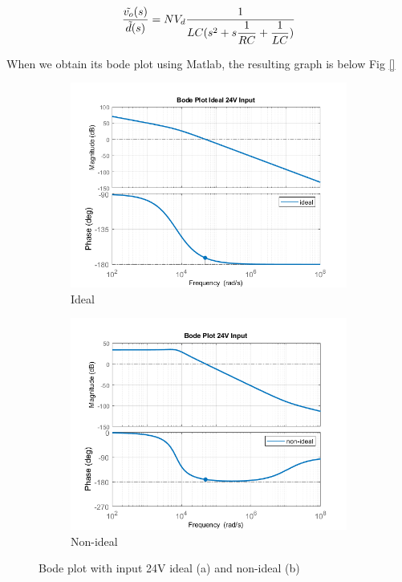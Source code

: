 \begin{equation}
   \dfrac{\Tilde{v_o}(s)}{\Tilde{d}(s)} = NV_d \dfrac{1}{LC (s^2 + s \dfrac{1}{RC} + \dfrac{1}{LC}) }
\end{equation}

When we obtain its bode plot using Matlab, the resulting graph is below Fig \ref{}

\begin{figure}[H]
\centering
\begin{subfigure}{7 cm}
  \centering
  \includegraphics[width=7 cm]{Figs/bode_24_ideal.png}
  \caption{Ideal}
  \label{fig:bode_24}
\end{subfigure}%
\begin{subfigure}{7 cm}
  \centering
  \includegraphics[width=7 cm]{Figs/bode_24_non.png}
  \caption{Non-ideal}
  \label{fig:bode_non_24}
\end{subfigure}
\caption{Bode plot with input 24V ideal (a) and non-ideal (b)}
\label{fig:bode24}
\end{figure}

